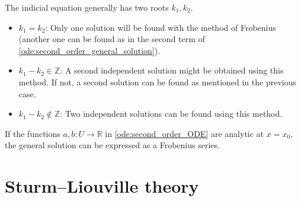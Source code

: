     \begin{property}
        The indicial equation generally has two roots $k_1,k_2$.
        \begin{itemize}
            \item $k_1=k_2$: Only one solution will be found with the method of Frobenius (another one can be found as in the second term of \cref{ode:second_order_general_solution}).
            \item $k_1-k_2 \in\mathbb{Z}$: A second independent solution might be obtained using this method. If not, a second solution can be found as mentioned in the previous case.
            \item $k_1-k_2\not\in\mathbb{Z}$: Two independent solutions can be found using this method.
        \end{itemize}
    \end{property}

    \begin{theorem}[Fuchs]
        If the functions $a,b:U\rightarrow\mathbb{R}$ in \cref{ode:second_order_ODE} are analytic at $x=x_0$, the general solution can be expressed as a Frobenius series.
    \end{theorem}

\section{Sturm--Liouville theory}


